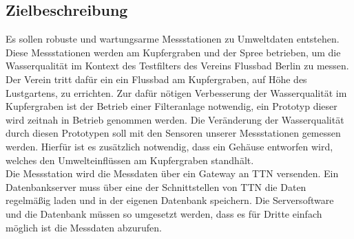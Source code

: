 \subsection{Zielbeschreibung}


Es sollen robuste und wartungsarme Messstationen zu Umweltdaten entstehen. Diese Messstationen werden am Kupfergraben und der Spree betrieben, um die Wasserqualität im Kontext des Testfilters des Vereins Flussbad Berlin zu messen. Der Verein tritt dafür ein ein Flussbad am Kupfergraben, auf Höhe des Lustgartens, zu errichten. Zur dafür nötigen Verbesserung der Wasserqualität im Kupfergraben ist der Betrieb einer Filteranlage notwendig, ein Prototyp dieser wird zeitnah  in Betrieb genommen werden. Die Veränderung der Wasserqualität durch diesen Prototypen soll mit den Sensoren unserer Messstationen gemessen werden. Hierfür ist es zusätzlich notwendig, dass ein Gehäuse entworfen wird, welches den Umwelteinflüssen am Kupfergraben standhält.\\
Die Messstation wird die Messdaten über ein Gateway an TTN versenden. Ein Datenbankserver muss über eine der Schnittstellen von TTN die Daten regelmäßig laden und in der eigenen Datenbank speichern. Die Serversoftware und die Datenbank müssen so umgesetzt werden, dass es für Dritte einfach möglich ist die Messdaten abzurufen.

